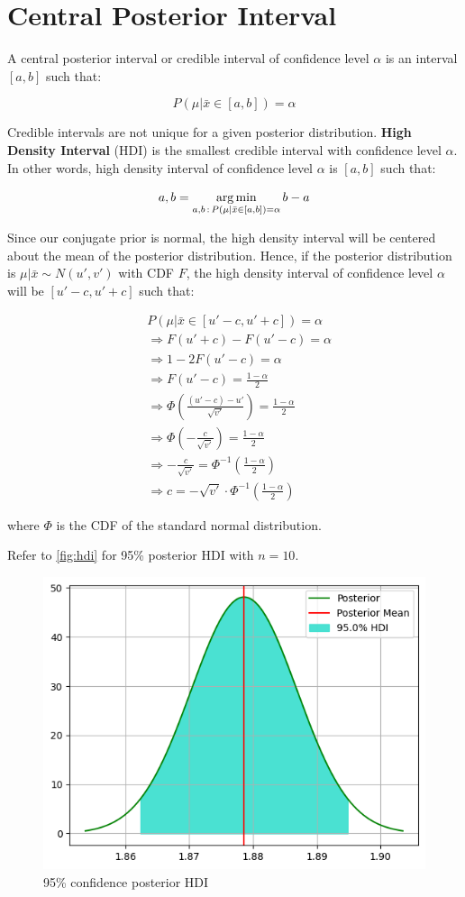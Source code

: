 \section{Central Posterior Interval}

A central posterior interval or credible interval of confidence level $\alpha$ is an interval $[a, b]$ such that:

$$ P(\mu | \bar{x} \in [a, b]) = \alpha $$

Credible intervals are not unique for a given posterior distribution.
\textbf{High Density Interval} (HDI) is the smallest credible interval with confidence level $\alpha$.
In other words, high density interval of confidence level $\alpha$ is $[a, b]$ such that:

\[ a, b = \operatorname*{arg\,min}_{a, b \, : \, P(\mu | \bar{x} \in [a, b]) = \alpha} b - a \]

Since our conjugate prior is normal, the high density interval will be centered about the mean of the posterior distribution.
Hence, if the posterior distribution is $\mu | \bar{x} \sim N(u', v')$ with CDF $F$, the high density interval of confidence level $\alpha$ will be $[u' - c, u' + c]$ such that:

\begin{align*}
&P(\mu |\bar{x} \in [u' - c, u' + c]) = \alpha \\
&\Rightarrow F(u' + c) - F(u' - c) = \alpha \\
&\Rightarrow 1 - 2F(u' - c) = \alpha \\
&\Rightarrow F(u' - c) = \frac{1 - \alpha}{2} \\
&\Rightarrow \Phi(\frac{(u' - c) - u'}{\sqrt{v'}}) = \frac{1 - \alpha}{2} \\
&\Rightarrow \Phi(-\frac{c}{\sqrt{v'}}) = \frac{1 - \alpha}{2} \\
&\Rightarrow -\frac{c}{\sqrt{v'}} = \Phi^{-1}\left(\frac{1 - \alpha}{2}\right) \\
&\Rightarrow c = -\sqrt{v'} \cdot \Phi^{-1}\left(\frac{1 - \alpha}{2}\right)
\end{align*}

\noindent where $\Phi$ is the CDF of the standard normal distribution.

Refer to \autoref{fig:hdi} for 95\% posterior HDI with $n = 10$.

\begin{figure}
    \centering
    \includegraphics[width=.6\linewidth]{images/hdi.png}
    \caption{95\% confidence posterior HDI}
    \label{fig:hdi}
\end{figure}
